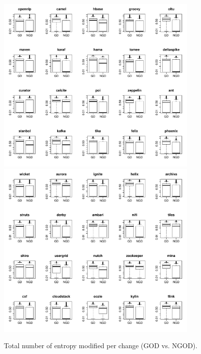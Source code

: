 \begin{figure}[tb]
	\centering
	\includegraphics[width=100mm]{figures/chapter4/rq3_god_entropy_logged_1}
	\includegraphics[width=100mm]{figures/chapter4/rq3_god_entropy_logged_2}
	\caption{Total number of entropy modified per change (GOD vs. NGOD).}
	\label{figure:total_entropy_god_vs_ngod}
\end{figure}


